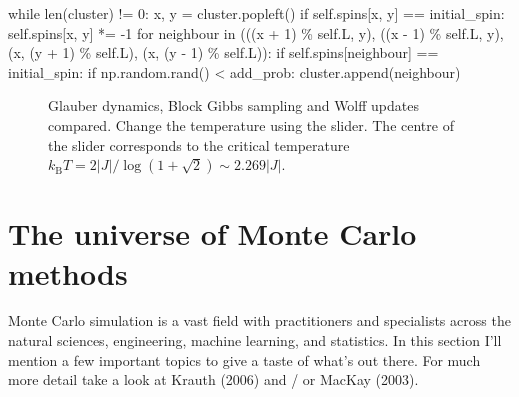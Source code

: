 \documentclass[
  letterpaper,
  DIV=11,
  numbers=noendperiod]{scrreprt}
\newenvironment{Shaded}{\begin{snugshade}}{\end{snugshade}}
\newcommand{\BuiltInTok}[1]{\textcolor[rgb]{0.00,0.23,0.31}{#1}}
\newcommand{\ControlFlowTok}[1]{\textcolor[rgb]{0.00,0.23,0.31}{#1}}
\newcommand{\DecValTok}[1]{\textcolor[rgb]{0.68,0.00,0.00}{#1}}
\newcommand{\KeywordTok}[1]{\textcolor[rgb]{0.00,0.23,0.31}{#1}}
\newcommand{\NormalTok}[1]{\textcolor[rgb]{0.00,0.23,0.31}{#1}}
\newcommand{\OperatorTok}[1]{\textcolor[rgb]{0.37,0.37,0.37}{#1}}
\newcommand{\VariableTok}[1]{\textcolor[rgb]{0.07,0.07,0.07}{#1}}
\theoremstyle{definition}
\theoremstyle{remark}
\begin{document}
\begin{Shaded}
\begin{Highlighting}[]
        \ControlFlowTok{while} \BuiltInTok{len}\NormalTok{(cluster) }\OperatorTok{!=} \DecValTok{0}\NormalTok{:}
\NormalTok{            x, y }\OperatorTok{=}\NormalTok{ cluster.popleft()}
            \ControlFlowTok{if} \VariableTok{self}\NormalTok{.spins[x, y] }\OperatorTok{==}\NormalTok{ initial\_spin:}
                \VariableTok{self}\NormalTok{.spins[x, y] }\OperatorTok{*=} \OperatorTok{{-}}\DecValTok{1}
                \ControlFlowTok{for}\NormalTok{ neighbour }\KeywordTok{in}\NormalTok{ (((x }\OperatorTok{+} \DecValTok{1}\NormalTok{) }\OperatorTok{\%} \VariableTok{self}\NormalTok{.L, y), ((x }\OperatorTok{{-}} \DecValTok{1}\NormalTok{) }\OperatorTok{\%} \VariableTok{self}\NormalTok{.L, y), (x, (y }\OperatorTok{+} \DecValTok{1}\NormalTok{) }\OperatorTok{\%} \VariableTok{self}\NormalTok{.L), (x, (y }\OperatorTok{{-}} \DecValTok{1}\NormalTok{) }\OperatorTok{\%} \VariableTok{self}\NormalTok{.L)):}
                    \ControlFlowTok{if} \VariableTok{self}\NormalTok{.spins[neighbour] }\OperatorTok{==}\NormalTok{ initial\_spin:}
                        \ControlFlowTok{if}\NormalTok{ np.random.rand() }\OperatorTok{\textless{}}\NormalTok{ add\_prob:}
\NormalTok{                            cluster.append(neighbour)}
\end{Highlighting}
\end{Shaded}

\begin{figure}

{\centering 

\hypertarget{ising-simulation}{}

}

\caption{\label{fig-ising}Glauber dynamics, Block Gibbs sampling and
Wolff updates compared. Change the temperature using the slider. The
centre of the slider corresponds to the critical temperature
\(k_\text{B}T = 2|J|/\log(1+\sqrt{2})\sim 2.269|J|\).}

\end{figure}

\hypertarget{the-universe-of-monte-carlo-methods}{%
\section{The universe of Monte Carlo
methods}\label{the-universe-of-monte-carlo-methods}}

Monte Carlo simulation is a vast field with practitioners and
specialists across the natural sciences, engineering, machine learning,
and statistics. In this section I'll mention a few important topics to
give a taste of what's out there. For much more detail take a look at
Krauth (2006) and / or MacKay (2003).
\end{document}
